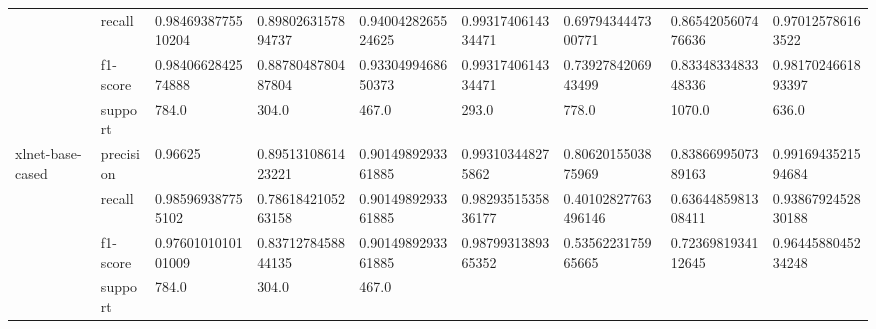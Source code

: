 \begin{landscape}
\begin{table}[]
{\begin{tabular}{@{}lllllllll@{}}
\multicolumn{1}{|l|}{} &
  \multicolumn{1}{l|}{recall} &
  \multicolumn{1}{l|}{0.9846938775510204} &
  \multicolumn{1}{l|}{0.8980263157894737} &
  \multicolumn{1}{l|}{0.9400428265524625} &
  \multicolumn{1}{l|}{0.9931740614334471} &
  \multicolumn{1}{l|}{0.6979434447300771} &
  \multicolumn{1}{l|}{0.8654205607476636} &
  \multicolumn{1}{l|}{0.970125786163522} \\ \cmidrule(l){2-9} 
\multicolumn{1}{|l|}{} &
  \multicolumn{1}{l|}{f1-score} &
  \multicolumn{1}{l|}{0.9840662842574888} &
  \multicolumn{1}{l|}{0.8878048780487804} &
  \multicolumn{1}{l|}{0.9330499468650373} &
  \multicolumn{1}{l|}{0.9931740614334471} &
  \multicolumn{1}{l|}{0.7392784206943499} &
  \multicolumn{1}{l|}{0.8334833483348336} &
  \multicolumn{1}{l|}{0.9817024661893397} \\ \cmidrule(l){2-9} 
\multicolumn{1}{|l|}{} &
  \multicolumn{1}{l|}{support} &
  \multicolumn{1}{l|}{784.0} &
  \multicolumn{1}{l|}{304.0} &
  \multicolumn{1}{l|}{467.0} &
  \multicolumn{1}{l|}{293.0} &
  \multicolumn{1}{l|}{778.0} &
  \multicolumn{1}{l|}{1070.0} &
  \multicolumn{1}{l|}{636.0} \\ \midrule
\multicolumn{1}{|l|}{\multirow{4}{*}{xlnet-base-cased}} &
  \multicolumn{1}{l|}{precision} &
  \multicolumn{1}{l|}{0.96625} &
  \multicolumn{1}{l|}{0.8951310861423221} &
  \multicolumn{1}{l|}{0.9014989293361885} &
  \multicolumn{1}{l|}{0.993103448275862} &
  \multicolumn{1}{l|}{0.8062015503875969} &
  \multicolumn{1}{l|}{0.8386699507389163} &
  \multicolumn{1}{l|}{0.9916943521594684} \\ \cmidrule(l){2-9} 
\multicolumn{1}{|l|}{} &
  \multicolumn{1}{l|}{recall} &
  \multicolumn{1}{l|}{0.985969387755102} &
  \multicolumn{1}{l|}{0.7861842105263158} &
  \multicolumn{1}{l|}{0.9014989293361885} &
  \multicolumn{1}{l|}{0.9829351535836177} &
  \multicolumn{1}{l|}{0.40102827763496146} &
  \multicolumn{1}{l|}{0.6364485981308411} &
  \multicolumn{1}{l|}{0.9386792452830188} \\ \cmidrule(l){2-9} 
\multicolumn{1}{|l|}{} &
  \multicolumn{1}{l|}{f1-score} &
  \multicolumn{1}{l|}{0.9760101010101009} &
  \multicolumn{1}{l|}{0.8371278458844135} &
  \multicolumn{1}{l|}{0.9014989293361885} &
  \multicolumn{1}{l|}{0.9879931389365352} &
  \multicolumn{1}{l|}{0.5356223175965665} &
  \multicolumn{1}{l|}{0.7236981934112645} &
  \multicolumn{1}{l|}{0.9644588045234248} \\ \cmidrule(l){2-9} 
\multicolumn{1}{|l|}{} &
  \multicolumn{1}{l|}{support} &
  \multicolumn{1}{l|}{784.0} &
  \multicolumn{1}{l|}{304.0} &
  \multicolumn{1}{l|}{467.0} &

\end{tabular}}
\end{table}
\end{landscape}
